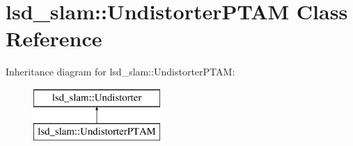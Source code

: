 \hypertarget{classlsd__slam_1_1_undistorter_p_t_a_m}{\section{lsd\-\_\-slam\-:\-:Undistorter\-P\-T\-A\-M Class Reference}
\label{classlsd__slam_1_1_undistorter_p_t_a_m}
}
Inheritance diagram for lsd\-\_\-slam\-:\-:Undistorter\-P\-T\-A\-M\-:\begin{figure}[H]
\begin{center}
\leavevmode
\includegraphics[height=2.000000cm]{classlsd__slam_1_1_undistorter_p_t_a_m}
\end{center}
\end{figure}
